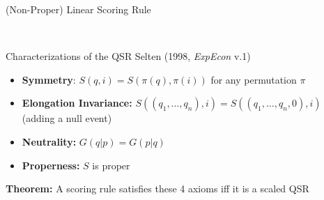 \begin{frame}{(Non-Proper) Linear Scoring Rule}
\begin{center}
\br
        \\
    \end{center}
\end{frame}

\begin{frame}{Characterizations of the QSR}
Selten (1998, \textit{ExpEcon} v.1)
\begin{itemize}
    \item \textbf{Symmetry}: $S(q,i)=S(\pi(q),\pi(i))$ for any permutation $\pi$
    \item \textbf{Elongation Invariance:} $S((q_1,\ldots,q_n),i)=S((q_1,\ldots,q_n,0),i)$ (adding a null event)
    \item \textbf{Neutrality:} $G(q|p)=G(p|q)$
    \item \textbf{Properness:} $S$ is proper
\end{itemize}
\br
\textbf{Theorem:} A scoring rule satisfies these 4 axioms iff it is a scaled QSR
\end{frame}

